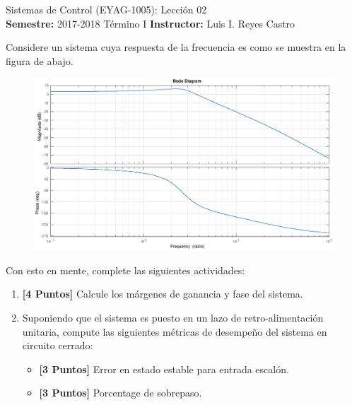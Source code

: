 \documentclass[ a4paper, twoside, 11pt]{article}
\newcommand{\numero}{02}
\begin{document}
\allowdisplaybreaks

\begin{center}
\Large Sistemas de Control (EYAG-1005): Lecci\'on \numero \\[1ex]
\small \textbf{Semestre:} 2017-2018 T\'ermino I \qquad
\textbf{Instructor:} Luis I. Reyes Castro
\end{center}
\halfskip



\begin{problem}
Considere un sistema cuya respuesta de la frecuencia es como se muestra en la figura de abajo. 

\begin{figure}[htb]
\centering
\includegraphics[width=\textwidth]{leccion-bode.eps}
\end{figure}

Con esto en mente, complete las siguientes actividades: 
\begin{enumerate}[label=\alph*.]
\item \textbf{[4 Puntos]} Calcule los m\'argenes de ganancia y fase del sistema. 
\item Suponiendo que el sistema es puesto en un lazo de retro-alimentaci\'on unitaria, compute las siguientes m\'etricas de desempe\~no del sistema en circuito cerrado: 
\begin{itemize}
\item \textbf{[3 Puntos]} Error en estado estable para entrada escal\'on.  
\item \textbf{[3 Puntos]} Porcentage de sobrepaso. 
\end{itemize}
\end{enumerate}

\end{problem}
\vspace{\baselineskip}
\end{document}
